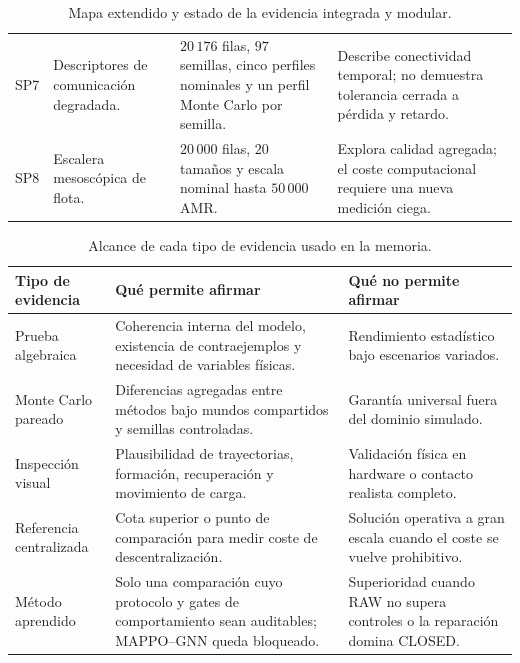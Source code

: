 \begin{table}[H]
\begin{tabularx}{\textwidth}{@{}p{}p{}p{}X@{}}
SP7 & Descriptores de comunicación degradada. & $20\,176$ filas, $97$ semillas, cinco perfiles nominales y un perfil Monte Carlo por semilla. & Describe conectividad temporal; no demuestra tolerancia cerrada a pérdida y retardo. \\
SP8 & Escalera mesoscópica de flota. & $20\,000$ filas, $20$ tamaños y escala nominal hasta $50\,000$ AMR. & Explora calidad agregada; el coste computacional requiere una nueva medición ciega. \\
\bottomrule
\end{tabularx}
\caption{Mapa extendido y estado de la evidencia integrada y modular.}
\label{tab:mapa-extendido-sp}
\end{table}

\begin{table}[H]
\centering
\scriptsize
\begin{tabularx}{\textwidth}{@{}p{}p{}X@{}}
\toprule
Tipo de evidencia & Qué permite afirmar & Qué no permite afirmar \\
\midrule
Prueba algebraica & Coherencia interna del modelo, existencia de contraejemplos y necesidad de variables físicas. & Rendimiento estadístico bajo escenarios variados. \\
Monte Carlo pareado & Diferencias agregadas entre métodos bajo mundos compartidos y semillas controladas. & Garantía universal fuera del dominio simulado. \\
Inspección visual & Plausibilidad de trayectorias, formación, recuperación y movimiento de carga. & Validación física en hardware o contacto realista completo. \\
Referencia centralizada & Cota superior o punto de comparación para medir coste de descentralización. & Solución operativa a gran escala cuando el coste se vuelve prohibitivo. \\
Método aprendido & Solo una comparación cuyo protocolo y gates de comportamiento sean auditables; MAPPO--GNN queda bloqueado. & Superioridad cuando RAW no supera controles o la reparación domina CLOSED. \\
\bottomrule
\end{tabularx}
\caption{Alcance de cada tipo de evidencia usado en la memoria.}
\label{tab:alcance-evidencia}
\end{table}

